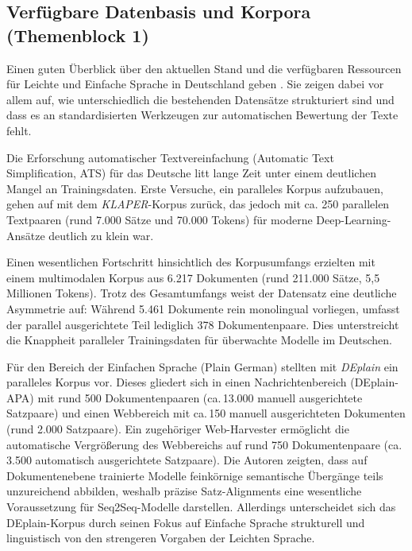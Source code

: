 \label{sec:stand_der_forschung}

\subsection{Verfügbare Datenbasis und Korpora (Themenblock 1)}
\label{sec:datenbasis_korpora}

Einen guten Überblick über den aktuellen Stand und die verfügbaren Ressourcen für Leichte und Einfache Sprache in Deutschland geben \citet{madina2023easy}. Sie zeigen dabei vor allem auf, wie unterschiedlich die bestehenden Datensätze strukturiert sind und dass es an standardisierten Werkzeugen zur automatischen Bewertung der Texte fehlt.

Die Erforschung automatischer Textvereinfachung (Automatic Text Simplification, ATS) für das Deutsche litt lange Zeit unter einem deutlichen Mangel an Trainingsdaten. Erste Versuche, ein paralleles Korpus aufzubauen, gehen auf \citet{klaper2013klaper} mit dem \textit{KLAPER}-Korpus zurück, das jedoch mit ca. 250 parallelen Textpaaren (rund 7.000 Sätze und 70.000 Tokens) für moderne Deep-Learning-Ansätze deutlich zu klein war. 

Einen wesentlichen Fortschritt hinsichtlich des Korpusumfangs erzielten \citet{battisti2020corpus} mit einem multimodalen Korpus aus 6.217 Dokumenten (rund 211.000 Sätze, 5,5 Millionen Tokens). Trotz des Gesamtumfangs weist der Datensatz eine deutliche Asymmetrie auf: Während 5.461 Dokumente rein monolingual vorliegen, umfasst der parallel ausgerichtete Teil lediglich 378 Dokumentenpaare. Dies unterstreicht die Knappheit paralleler Trainingsdaten für überwachte Modelle im Deutschen.

Für den Bereich der Einfachen Sprache (Plain German) stellten \citet{stodden2023deplain} mit \textit{DEplain} ein paralleles Korpus vor. Dieses gliedert sich in einen Nachrichtenbereich (DEplain-APA) mit rund 500 Dokumentenpaaren (ca.\,13.000 manuell ausgerichtete Satzpaare) und einen Webbereich mit ca.\,150 manuell ausgerichteten Dokumenten (rund 2.000 Satzpaare). Ein zugehöriger Web-Harvester ermöglicht die automatische Vergrößerung des Webbereichs auf rund 750 Dokumentenpaare (ca.\,3.500 automatisch ausgerichtete Satzpaare). Die Autoren zeigten, dass auf Dokumentenebene trainierte Modelle feinkörnige semantische Übergänge teils unzureichend abbilden, weshalb präzise Satz-Alignments eine wesentliche Voraussetzung für Seq2Seq-Modelle darstellen. Allerdings unterscheidet sich das DEplain-Korpus durch seinen Fokus auf Einfache Sprache strukturell und linguistisch von den strengeren Vorgaben der Leichten Sprache.

